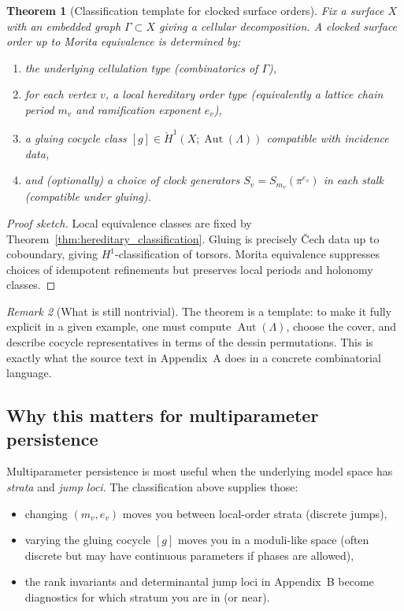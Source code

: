 \documentclass[11pt,oneside]{amsbook}
\numberwithin{equation}{section}
\theoremstyle{plain}
\newtheorem{theorem}{Theorem}[section]
\theoremstyle{definition}
\theoremstyle{remark}
\newtheorem{remark}[theorem]{Remark}
\DeclareMathOperator{\Aut}{\mathrm{Aut}}
\begin{document}
\begin{theorem}[Classification template for clocked surface orders]
\label{thm:surface_order_template}
Fix a surface $X$ with an embedded graph $\Gamma\subset X$ giving a cellular decomposition.
A clocked surface order up to Morita equivalence is determined by:
\begin{enumerate}
\item the underlying cellulation type (combinatorics of $\Gamma$),
\item for each vertex $v$, a local hereditary order type (equivalently a lattice chain period $m_v$ and ramification exponent $e_v$),
\item a gluing cocycle class $[g]\in \check{H}^1(X;\Aut(\Lambda))$ compatible with incidence data,
\item and (optionally) a choice of clock generators $S_v=S_{m_v}(\pi^{e_v})$ in each stalk (compatible under gluing).
\end{enumerate}
\end{theorem}

\begin{proof}[Proof sketch]
Local equivalence classes are fixed by Theorem~\ref{thm:hereditary_classification}.
Gluing is precisely \v{C}ech data up to coboundary, giving $H^1$-classification of torsors.
Morita equivalence suppresses choices of idempotent refinements but preserves local periods and holonomy classes.
\end{proof}

\begin{remark}[What is still nontrivial]
The theorem is a template: to make it fully explicit in a given example, one must compute $\Aut(\Lambda)$, choose the cover, and describe cocycle representatives in terms of the dessin permutations.
This is exactly what the source text in Appendix~A does in a concrete combinatorial language.
\end{remark}

\subsection{Why this matters for multiparameter persistence}
\label{sec:classification_persistence}

Multiparameter persistence is most useful when the underlying model space has \emph{strata} and \emph{jump loci}.
The classification above supplies those:

\begin{itemize}
\item changing $(m_v,e_v)$ moves you between local-order strata (discrete jumps),
\item varying the gluing cocycle $[g]$ moves you in a moduli-like space (often discrete but may have continuous parameters if phases are allowed),
\item the rank invariants and determinantal jump loci in Appendix~B become diagnostics for which stratum you are in (or near).
\end{itemize}
\end{document}
